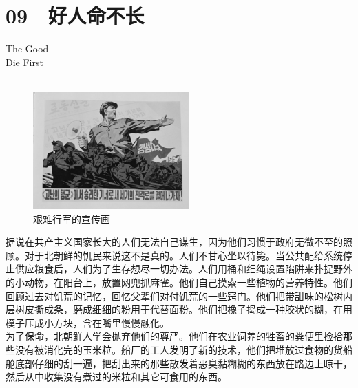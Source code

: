 \fancyhead[RO]{{\tiny{\textcolor{Gray}{\FA \ }}}\thepage}
\fancyhead[LE]{{\tiny{\textcolor{Gray}{\FA \ }}}\thepage}
\fancyfoot[LE,RO]{}
\fancyfoot[LO,CE]{}
\fancyfoot[CO,RE]{}
\chapter*{09 {\FA } 好人命不长}
\vspace{5mm}
\begin{flushright}
	\textcolor{PinYinColor}{\EN \huge{The Good\\
	Die First\\
	\ \\}}
\end{flushright}
\begin{figure}[!htbp]
	\centering
	\includegraphics[width=6cm]{./Chapters/Images/09.jpg}
	\caption*{艰难行军的宣传画}
\end{figure}


据说在共产主义国家长大的人们无法自己谋生，因为他们习惯于政府无微不至的照顾。对于北朝鲜的饥民来说这不是真的。人们不甘心坐以待毙。当公共配给系统停止供应粮食后，人们为了生存想尽一切办法。人们用桶和细绳设置陷阱来扑捉野外的小动物，在阳台上，放置网兜抓麻雀。他们自己摸索一些植物的营养特性。他们回顾过去对饥荒的记忆，回忆父辈们对付饥荒的一些窍门。他们把带甜味的松树内层树皮撕成条，磨成细细的粉用于代替面粉。他们把橡子捣成一种胶状的糊，在用模子压成小方块，含在嘴里慢慢融化。\\

为了保命，北朝鲜人学会抛弃他们的尊严。他们在农业饲养的牲畜的粪便里捡拾那些没有被消化完的玉米粒。船厂的工人发明了新的技术，他们把堆放过食物的货船舱底部仔细的刮一遍，把刮出来的那些散发着恶臭黏糊糊的东西放在路边上晾干，然后从中收集没有煮过的米粒和其它可食用的东西。\\

